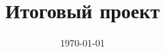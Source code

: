 \documentclass[14pt,a4paper,oneside]{extarticle}
\title{Итоговый проект}
\date{\today}
\begin{document}
    \renewcommand{\figurename}{Рисунок}
    \renewcommand{\contentsname}{Содержание}
    \tableofcontents

    
\end{document}
